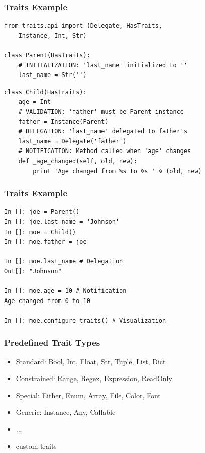\documentclass[14pt,compress]{beamer}
\newcounter{time}
\newcommand{\inctime}[1]{\addtocounter{time}{#1}{\tiny \thetime\ m}}
\begin{document}
\begin{frame}
  \frametitle{Traits Example}
\vspace*{-16pt}
\footnotesize
\begin{lstlisting}
from traits.api import (Delegate, HasTraits, 
    Instance, Int, Str)

class Parent(HasTraits):
    # INITIALIZATION: 'last_name' initialized to ''
    last_name = Str('') 
\end{lstlisting}
\pause
\begin{lstlisting}
class Child(HasTraits):
    age = Int
    # VALIDATION: 'father' must be Parent instance
    father = Instance(Parent)
    # DELEGATION: 'last_name' delegated to father's 
    last_name = Delegate('father') 
    # NOTIFICATION: Method called when 'age' changes
    def _age_changed(self, old, new): 
        print 'Age changed from %s to %s ' % (old, new)
\end{lstlisting}
\end{frame}

\begin{frame}
  \frametitle{Traits Example}
\vspace*{-6pt}
\small
\begin{lstlisting}
In []: joe = Parent()
In []: joe.last_name = 'Johnson'
In []: moe = Child()
In []: moe.father = joe

In []: moe.last_name # Delegation
Out[]: "Johnson"

In []: moe.age = 10 # Notification
Age changed from 0 to 10

In []: moe.configure_traits() # Visualization
\end{lstlisting}
\inctime{10}
\end{frame}


\begin{frame}
    \frametitle{Predefined Trait Types}
    \vspace*{-6pt}
    \small
    \begin{itemize}
        \item Standard: Bool, Int, Float, Str, Tuple, List, Dict
        \item Constrained: Range, Regex, Expression, ReadOnly
        \item Special: Either, Enum, Array, File, Color, Font
        \item Generic: Instance, Any, Callable
        \item ...
        \item custom traits
    \end{itemize}
\end{frame}
\end{document}
